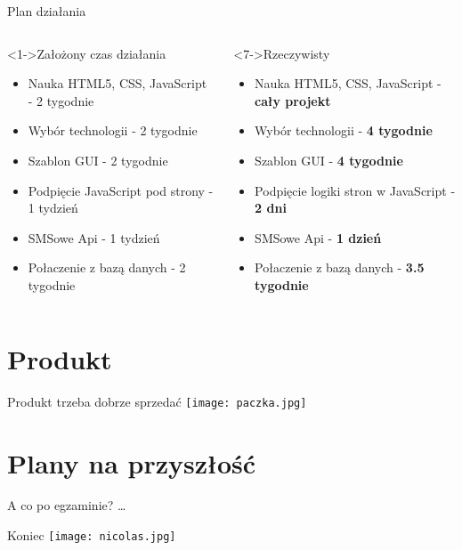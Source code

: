 \documentclass{beamer}
\begin{document}
\begin{frame}{Plan działania}
     \begin{columns}[T] %
     
          \begin{column}[T]{5cm} %
     \begin{block}<1->{Założony czas działania}
	\begin{itemize}
    \item<1-> Nauka HTML5, CSS, JavaScript - 2 tygodnie
    \item<2-> Wybór technologii - 2 tygodnie
    \item<3-> Szablon GUI - 2 tygodnie
    \item<4-> Podpięcie JavaScript pod strony - 1 tydzień
    \item<5-> SMSowe Api - 1 tydzień
    \item<6-> Połaczenie z bazą danych - 2 tygodnie
    \end{itemize}
\end{block}
     \end{column}
    \begin{column}[T]{5cm}
       \begin{block}<7->{Rzeczywisty}
	\begin{itemize}
    \item<8-> Nauka HTML5, CSS, JavaScript - \textbf{cały projekt}
    \item<9-> Wybór technologii - \textbf{4 tygodnie}
    \item<10-> Szablon GUI - \textbf{4 tygodnie}
    \item<11-> Podpięcie logiki stron w JavaScript - \textbf{2 dni}
    \item<12-> SMSowe Api -  \textbf{1 dzień}
    \item<13-> Połaczenie z bazą danych - \textbf{3.5 tygodnie}
    \end{itemize}
\end{block}
     \end{column}
     \end{columns}
\end{frame}
\section{Produkt}
\begin{frame}{Produkt trzeba dobrze sprzedać}
 \texttt{[image: paczka.jpg]}
 \end{frame}
\section{Plany na przyszłość}
\begin{frame}{A co po egzaminie?}
\dots 
\end{frame}
\begin{frame}{Koniec}
 \texttt{[image: nicolas.jpg]}
\end{frame}
\end{document}
